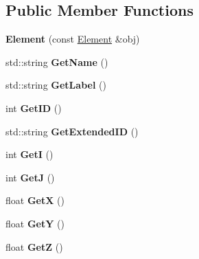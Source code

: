 \subsection*{Public Member Functions}
\begin{DoxyCompactItemize}
\item 
\hypertarget{classElement_a35c96bb94fc3c42ebb4eab1c51ce2a63}{{\bfseries Element} (const \hyperlink{classElement}{Element} \&obj)}\label{classElement_a35c96bb94fc3c42ebb4eab1c51ce2a63}

\item 
\hypertarget{classElement_aa38eb6cc012786635a632f11ec0c3c41}{std\+::string {\bfseries Get\+Name} ()}\label{classElement_aa38eb6cc012786635a632f11ec0c3c41}

\item 
\hypertarget{classElement_a12f6f5b01cd73e62382f319dbd71129b}{std\+::string {\bfseries Get\+Label} ()}\label{classElement_a12f6f5b01cd73e62382f319dbd71129b}

\item 
\hypertarget{classElement_a01c2709f33fe0773cad6089e8fc7261b}{int {\bfseries Get\+I\+D} ()}\label{classElement_a01c2709f33fe0773cad6089e8fc7261b}

\item 
\hypertarget{classElement_afedae45e6b3dd9f9a66a68a6e2acb937}{std\+::string {\bfseries Get\+Extended\+I\+D} ()}\label{classElement_afedae45e6b3dd9f9a66a68a6e2acb937}

\item 
\hypertarget{classElement_aa192e6c35a460ea561021f3b37c6700a}{int {\bfseries Get\+I} ()}\label{classElement_aa192e6c35a460ea561021f3b37c6700a}

\item 
\hypertarget{classElement_afb05febdece810f4b83541624fe530ee}{int {\bfseries Get\+J} ()}\label{classElement_afb05febdece810f4b83541624fe530ee}

\item 
\hypertarget{classElement_a0642f0da63632170f9fa9df021c977f1}{float {\bfseries Get\+X} ()}\label{classElement_a0642f0da63632170f9fa9df021c977f1}

\item 
\hypertarget{classElement_a4c4f314d040db786a716ed916a42ebd7}{float {\bfseries Get\+Y} ()}\label{classElement_a4c4f314d040db786a716ed916a42ebd7}

\item 
\hypertarget{classElement_af03625767fde8b12a09add84108c3f2d}{float {\bfseries Get\+Z} ()}\label{classElement_af03625767fde8b12a09add84108c3f2d}


\end{DoxyCompactItemize}
